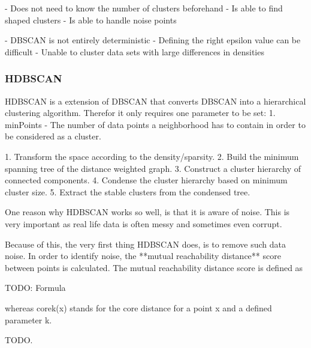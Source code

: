 - Does not need to know the number of clusters beforehand
- Is able to find shaped clusters
- Is able to handle noise points

- DBSCAN is not entirely deterministic
- Defining the right epsilon value can be difficult
- Unable to cluster data sets with large differences in densities

\subsubsection{HDBSCAN}

\iffalse
HDBSCAN is a hierarchical density-based clustering algorithm \cite{McInnes2017}.
It extends the well known [insert citation] DBSCAN algorithm and reduces its sensitivity for clusters of varying densities.
Another important quality of HDBSCAN is, that it does not need to know the number of clusters up front.
\fi

HDBSCAN is a extension of DBSCAN that converts DBSCAN into a hierarchical clustering algorithm.
Therefor it only requires one parameter to be set:
1. minPoints - The number of data points a neighborhood has to contain in order to be considered as a cluster.

1. Transform the space according to the density/sparsity.
2. Build the minimum spanning tree of the distance weighted graph.
3. Construct a cluster hierarchy of connected components.
4. Condense the cluster hierarchy based on minimum cluster size.
5. Extract the stable clusters from the condensed tree.

One reason why HDBSCAN works so well, is that it is aware of noise.
This is very important as real life data is often messy and sometimes even corrupt.

Because of this, the very first thing HDBSCAN does, is to remove such data noise.
In order to identify noise, the **mutual reachability distance** score between
points is calculated. The mutual reachability distance score is defined as

TODO: Formula

whereas corek(x) stands for the core distance for a point x and a defined parameter k.

TODO.
